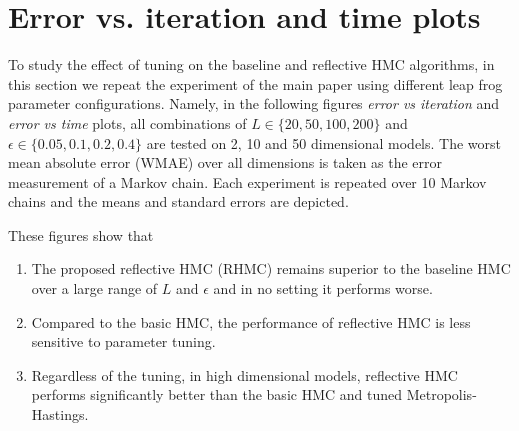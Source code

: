 \documentclass{article} %
\newcommand{\El}{267670}
\newcommand{\Eps}{0.05}
\begin{document}
\newpage

\section{Error vs. iteration and time plots}
To study the effect of tuning on the baseline and reflective HMC algorithms, in this section we repeat the experiment of the main paper using different leap frog parameter configurations.
Namely, in the following figures \emph{error vs iteration} and \emph{error vs time} plots, all combinations of $L \in \{20, 50, 100, 200\}$ and $\epsilon \in \{0.05, 0.1, 0.2, 0.4\}$ are tested on 2, 10 and 50 dimensional models. 
The worst mean absolute error (WMAE) over all dimensions is taken as the error measurement of a Markov chain. 
Each experiment is repeated over 10 Markov chains and the means and standard errors are depicted.  

These figures show that 
\begin{enumerate}
\item 
The proposed reflective HMC (RHMC) remains superior to the baseline HMC over a large range of $L$ and $\epsilon$ and in no setting it performs worse.
\item Compared to the basic HMC, the performance of reflective HMC is less sensitive to parameter tuning.
\item Regardless of the tuning, in high dimensional models, reflective HMC performs significantly better than the basic HMC and tuned Metropolis-Hastings.
\end{enumerate}





\renewcommand{\El}{20}
\renewcommand{\Eps}{0.05}

\renewcommand{\El}{20}
\renewcommand{\Eps}{0.1}

\renewcommand{\El}{20}
\renewcommand{\Eps}{0.2}

\renewcommand{\El}{20}
\renewcommand{\Eps}{0.4}

\renewcommand{\El}{50}
\renewcommand{\Eps}{0.05}

\renewcommand{\El}{50}
\renewcommand{\Eps}{0.1}

\renewcommand{\El}{50}
\renewcommand{\Eps}{0.2}

\renewcommand{\El}{50}
\renewcommand{\Eps}{0.4}

\renewcommand{\El}{100}
\renewcommand{\Eps}{0.05}

\renewcommand{\El}{100}
\renewcommand{\Eps}{0.1}

\renewcommand{\El}{100}
\renewcommand{\Eps}{0.2}

\renewcommand{\El}{100}
\renewcommand{\Eps}{0.4}

\renewcommand{\El}{200}
\renewcommand{\Eps}{0.05}

\renewcommand{\El}{200}
\renewcommand{\Eps}{0.1}

\renewcommand{\El}{200}
\renewcommand{\Eps}{0.2}
 
\renewcommand{\El}{200}
\renewcommand{\Eps}{0.4}
 
\end{document}

